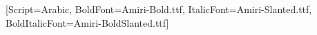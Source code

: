 \newfontfamily{}[Script=Arabic, BoldFont=Amiri-Bold.ttf, ItalicFont=Amiri-Slanted.ttf, BoldItalicFont=Amiri-BoldSlanted.ttf]
\newcommand\CortexAr[1]{{\CortexArabic#1}}
